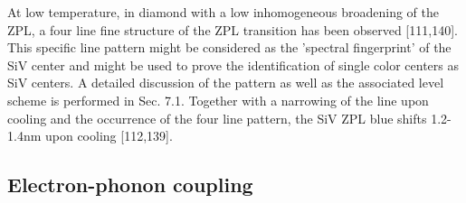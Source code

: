       At low temperature, in diamond with a low inhomogeneous broadening of the ZPL, a four line fine structure of the ZPL transition has been observed [111,140]. This specific line pattern might be considered as the ’spectral fingerprint’ of the SiV center and might be used to prove the identification of single color centers as SiV centers. A detailed discussion of the pattern as well as the associated level scheme is performed in Sec. 7.1. Together with a narrowing of the line upon cooling and the occurrence of the four line pattern, the SiV ZPL blue shifts 1.2-1.4nm upon cooling [112,139].

    \subsection{Electron-phonon coupling}

